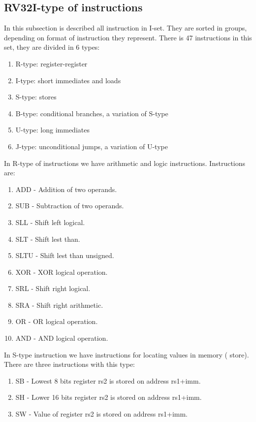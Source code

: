 \documentclass{scrreprt}
\begin{document}
    \subsection*{RV32I-type of instructions}
    In this subsection is described all instruction in I-set. They are sorted in groups, depending on format of instruction they represent. There is 47 instructions in this set, they are divided in 6 types: 
    \begin{enumerate}
        \item  R-type: register-register
        \item  I-type: short immediates and loads
        \item  S-type: stores
        \item  B-type: conditional branches, a variation of S-type
        \item  U-type: long immediates
        \item  J-type: unconditional jumps, a variation of U-type
    \end{enumerate}
    In R-type of instructions we have arithmetic and logic instructions. Instructions are:
    \begin{enumerate}
        \item ADD - Addition of two operands. 
        \item SUB - Subtraction of two operands. 
        \item SLL - Shift left logical. 
        \item SLT - Shift lest than. 
        \item SLTU - Shift lest than unsigned. 
        \item XOR - XOR logical operation. 
        \item SRL - Shift right logical. 
        \item SRA - Shift right arithmetic. 
        \item OR - OR logical operation. 
        \item AND - AND logical operation.
    \end{enumerate}
    \hfill \break
    In S-type instruction we have instructions for locating values in memory ( store). There are three instructions with this type:
    \begin{enumerate}
        \item SB - Lowest 8 bits register rs2 is stored on address rs1+imm. 
        \item SH - Lower 16 bits register rs2 is stored on address rs1+imm. 
        \item SW - Value of register rs2 is stored on address rs1+imm. 
    \end{enumerate}
\end{document}

